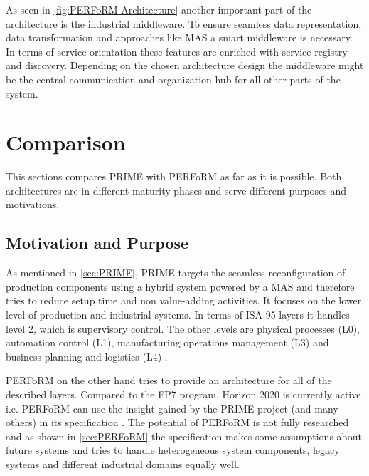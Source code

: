 \documentclass[conference,compsoc,hidelinks]{IEEEtran}
\begin{document}
As seen in \autoref{fig:PERFoRM-Architecture} another important part of the architecture is the industrial middleware. To ensure seamless data representation, data transformation and approaches like MAS a smart middleware is necessary. In terms of service-orientation these features are enriched with service registry and discovery. Depending on the chosen architecture design the middleware might be the central communication and organization hub for all other parts of the system.

\section{Comparison} \label{sec:comparison} %
This sections compares PRIME with PERFoRM as far as it is possible. Both architectures are in different maturity phases and serve different purposes and motivations.

\subsection{Motivation and Purpose}
As mentioned in \autoref{sec:PRIME}, PRIME targets the seamless reconfiguration of production components using a hybrid system powered by a MAS and therefore tries to reduce setup time and non value-adding activities. It focuses on the lower level of production and industrial systems. In terms of ISA-95 layers it handles level 2, which is supervisory control. The other levels are physical processes (L0), automation control (L1), manufacturing operations management (L3) and business planning and logistics (L4)  \cite{SpecPERFoRM}.

PERFoRM on the other hand tries to provide an architecture for all of the described layers. Compared  to the FP7 program, Horizon 2020 is currently active i.e. PERFoRM can use the insight gained by the PRIME project (and many others) in its specification \cite{SpecPERFoRM}. The potential of PERFoRM is not fully researched and as shown in \autoref{sec:PERFoRM} the specification makes some assumptions about future systems and tries to handle heterogeneous system components, legacy systems and different industrial domains equally well.
\end{document}
